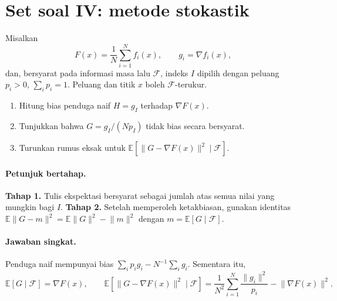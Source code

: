 
\section{Set soal IV: metode stokastik}
\label{orig03:ps04}

\begin{exercise}
\label{orig03:ps04:exercise:0001}
Misalkan
\[
  F(x)=\frac1N\sum_{i=1}^N f_i(x),
  \qquad g_i=\nabla f_i(x),
\]
dan, bersyarat pada informasi masa lalu $\mathcal F$, indeks $I$ dipilih dengan
peluang $p_i>0$, $\sum_i p_i=1$. Peluang dan titik $x$ boleh
$\mathcal F$-terukur.

\begin{enumerate}
  \item Hitung bias penduga naif $H=g_I$ terhadap $\nabla F(x)$.
  \item Tunjukkan bahwa $G=g_I/(Np_I)$ tidak bias secara bersyarat.
  \item Turunkan rumus eksak untuk
  $\mathbb E[\lVert G-\nabla F(x)\rVert^2\mid\mathcal F]$.
\end{enumerate}
\end{exercise}

\paragraph{Petunjuk bertahap.}
\label{orig03:ps04:hint:0001}
\textbf{Tahap 1.} Tulis ekspektasi bersyarat sebagai jumlah atas semua nilai
yang mungkin bagi $I$.
\textbf{Tahap 2.} Setelah memperoleh ketakbiasan, gunakan identitas
$\mathbb E\lVert G-m\rVert^2=\mathbb E\lVert G\rVert^2-\lVert m\rVert^2$
dengan $m=\mathbb E[G\mid\mathcal F]$.

\paragraph{Jawaban singkat.}
\label{orig03:ps04:answer:0001}
Penduga naif mempunyai bias
$\sum_i p_i g_i-N^{-1}\sum_i g_i$. Sementara itu,
\[
 \mathbb E[G\mid\mathcal F]=\nabla F(x),\qquad
 \mathbb E[\lVert G-\nabla F(x)\rVert^2\mid\mathcal F]
 =\frac1{N^2}\sum_{i=1}^N\frac{\lVert g_i\rVert^2}{p_i}
  -\lVert\nabla F(x)\rVert^2.
\]

